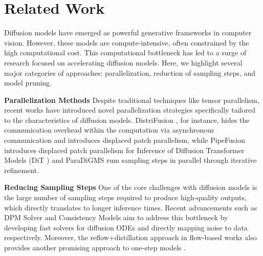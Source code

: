 \section{Related Work}
Diffusion models have emerged as powerful generative frameworks in computer vision. However, these models are compute-intensive, often constrained by the high computational cost. This computational bottleneck has led to a surge of research focused on accelerating diffusion models. Here, we highlight several major categories of approaches: parallelization, reduction of sampling steps, and model pruning.

\textbf{Parallelization Methods}
 Despite traditional techniques like tensor parallelism, recent works have introduced novel parallelization strategies specifically tailored to the characteristics of diffusion models. DistriFusion \citep{li2024distrifusiondistributedparallelinference}, for instance, hides the communication overhead within the computation via asynchronous communication and introduces displaced patch parallelism, while PipeFusion \citep{wang2024pipefusiondisplacedpatchpipeline} introduces displaced patch parallelism for Inference of Diffusion Transformer Models (DiT \citep{Peebles2022DiT}) and ParaDiGMS \citep{shih2023paradigms} rum sampling steps in parallel through iterative refinement.

\textbf{Reducing Sampling Steps}
One of the core challenges with diffusion models is the large number of sampling steps required to produce high-quality outputs, which directly translates to longer inference times. Recent advancements such as DPM Solver \citep{lu2022dpm,zheng2023dpmsolverv3improveddiffusionode} and Consistency Models \citep{song2023consistency,song2023improvedtechniquestrainingconsistency} aim to address this bottleneck by developing fast solvers for diffusion ODEs and directly mapping noise to data respectively.  Moreover, the reflow+distillation \citep{liu2022flowstraightfastlearning} approach in flow-based works \citep{lipman2022flow,tong2024improvinggeneralizingflowbasedgenerative} also provides another promising approach to one-step models \citep{liu2024instaflowstephighqualitydiffusionbased,yin2024one}.

